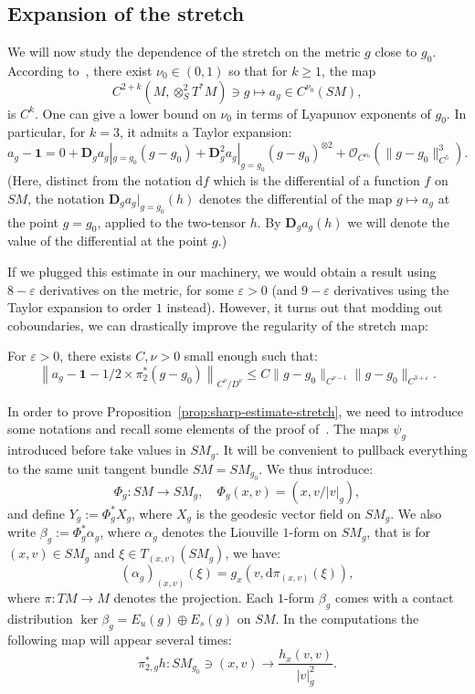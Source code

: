 \documentclass[AHL,Unicode,longabstracts,published]{cedram}
\newcommand{\bdD}{\mathbf{D}}
\newcommand{\bfun}{\mathbf{1}}
\newcommand{\eps}{\varepsilon}
\newcommand{\mc}{\mathcal}
\newcommand{\dd}{\mathrm{d}}
\begin{document}
\subsection{Expansion of the stretch}

We will now study the dependence of the stretch on the metric $g$ close to $g_0$. According to~\cite[Proposition~2.2]{Katok-Knieper-Pollicott-Weiss-89}, there exist $\nu_0\in (0,1)$ so that for $k\geq 1$, the map
\[
C^{2+k}\left(M,\otimes^2_S T^*M\right) \ni g \mapsto a_g \in C^{\nu_0}(SM),
\]
is $C^k$. One can give a lower bound on $\nu_0$ in terms of Lyapunov exponents of $g_0$. In particular, for $k=3$, it admits a Taylor expansion:
\begin{equation}\label{equation:taylor}
a_g - \bfun = 0 + \bdD_{g}a_g|_{g=g_0}(g-g_0) + \bdD^2_{g}a_g|_{g=g_0} (g-g_0)^{\otimes 2} + \mc{O}_{C^{\nu_0}}\left(\|g-g_0\|_{C^5}^3\right).
\end{equation}
(Here, distinct from the notation $\dd f$ which is the differential of a function $f$ on $SM$, the notation $\bdD_g a_{g} |_{g=g_0}(h)$ denotes the differential of the map $g \mapsto a_g$ at the point $g=g_0$, applied to the two-tensor $h$. By $\bdD_g a_{g} (h)$ we will denote the value of the differential at the point $g$.)

If we plugged this estimate in our machinery, we would obtain a result using $8-\eps$ derivatives on the metric, for some $\eps>0$ (and $9-\eps$ derivatives using the Taylor expansion to order $1$ instead). However, it turns out that modding out coboundaries, we can drastically improve the regularity of the stretch map:

\begin{prop}\label{prop:sharp-estimate-stretch}
For $\eps>0$, there exists $C,\nu>0$ small enough such that:
\begin{equation}
\left\|a_g - \bfun -1/2 \times \pi_2^\ast(g-g_0)\right\|_{C^\nu/D^\nu} \leq C \|g-g_0\|_{C^{\nu-1}} \|g-g_0\|_{C^{3+\eps}}.
\end{equation}
\end{prop}

In order to prove Proposition~\ref{prop:sharp-estimate-stretch}, we need to introduce some notations and recall some elements of the proof of~\cite[Proposition~2.2]{Katok-Knieper-Pollicott-Weiss-89}. The maps $\psi_g$ introduced before take values in $SM_g$. It will be convenient to pullback everything to the same unit tangent bundle $SM = SM_{g_0}$. We thus introduce:
\[
\Phi_g : SM \to SM_g,\quad\Phi_{g}(x,v) = (x,v/|v|_g),
\]
and define $Y_g := \Phi_g^* X_g$, where $X_g$ is the geodesic vector field on $SM_{g}$. We also write $\beta_g := \Phi_g^* \alpha_g$, where $\alpha_g$ denotes the Liouville $1$-form on $SM_g$, that is for $(x,v) \in SM_g$ and $\xi \in T_{(x,v)}(SM_g)$, we have:
\begin{equation}\label{equation:bam}
(\alpha_g)_{(x,v)}(\xi) = g_x\left(v, \dd\pi_{(x,v)}(\xi)\right),
\end{equation}
where $\pi : TM \to M$ denotes the projection. Each $1$-form $\beta_g$ comes with a contact distribution $\ker \beta_g = E_u(g) \oplus E_s(g)$ on $SM$. In the computations the following map will appear several times:
\[
\pi_{2,g}^\ast h : SM_{g_0} \owns (x,v) \to \frac{h_x(v,v)}{|v|_g^2}.
\]
\end{document}
